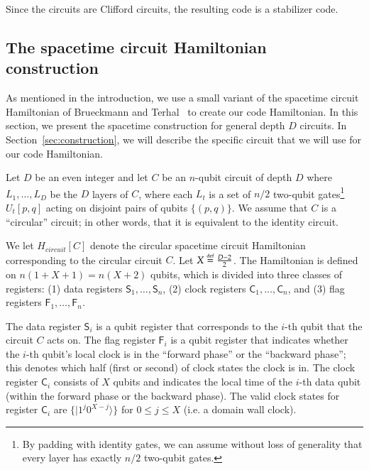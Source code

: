 \documentclass[11pt,letterpaper]{article}
\theoremstyle{definition}
\theoremstyle{remark}
\newcommand{\defeq}{\stackrel{\mbox{\normalfont\tiny def}}=}
\renewcommand{\leq}{\leqslant}
\numberwithin{equation}{section}
\theoremstyle{definition}
\newcommand{\ket}[1]{|#1\rangle}
\newcommand{\sC}{{\mathsf{C}}}
\newcommand{\sF}{{\mathsf{F}}}
\newcommand{\sS}{{\mathsf{S}}}
\begin{document}
Since the circuits are Clifford circuits, the resulting code is a stabilizer code.



\subsection{The spacetime circuit Hamiltonian construction}
\label{subsec:spacetimeconstruction}

As mentioned in the introduction, we use a small variant of the spacetime circuit Hamiltonian of Brueckmann and Terhal~\cite{breuckmann2014space} to create our code Hamiltonian. In this section, we present the spacetime construction for general depth $D$ circuits. In Section~\ref{sec:construction}, we will describe the specific circuit that we will use for our code Hamiltonian.

%

Let $D$ be an even integer and let $C$ be an $n$-qubit circuit of depth $D$ where $L_1,\ldots,L_{D}$ be the $D$ layers of $C$, where each $L_t$ is a set of $n/2$ two-qubit gates\footnote{By padding with identity gates, we can assume without loss of generality that every layer has exactly $n/2$ two-qubit gates.} $U_t[p,q]$ acting on disjoint pairs of qubits $\{ (p,q) \}$. We assume that $C$ is a ``circular'' circuit; in other words, that it is equivalent to the identity circuit. %

%
We let $H_{circuit}[C]$ denote the circular spacetime circuit Hamiltonian corresponding to the circular circuit $C$. Let $X \defeq \frac{D-2}{2}$. The Hamiltonian is defined on $n (1+ X+1)=n(X+2)$ qubits, which is divided into three classes of registers: (1) data registers $\sS_1,\ldots,\sS_n$, (2) clock registers $\sC_1,\ldots,\sC_n$, and (3) flag registers $\sF_1,\ldots,\sF_n$. 

The data register $\sS_i$ is a qubit register that corresponds to the $i$-th qubit that the circuit $C$ acts on. The flag register $\sF_i$ is a qubit register that indicates whether the $i$-th qubit's local clock is in the ``forward phase'' or the ``backward phase''; this denotes which half (first or second) of clock states the clock is in. The clock register $\sC_i$ consists of $X$ qubits and indicates the local time of the $i$-th data qubit (within the forward phase or the backward phase). The valid clock states for register $\sC_i$ are $\{\ket{1^j 0^{X - j}}\}$ for $0 \leq j \leq X$ (i.e. a domain wall clock).

%

%
%
%
%
%
\end{document}
